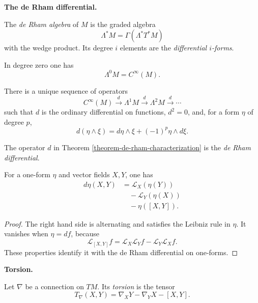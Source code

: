 \medskip\noindent
{\bf The de Rham differential.}

\begin{definition}
\label{definition-de-rham-algebra-course}
The {\it de Rham algebra} of $M$ is the
graded algebra
$$
\Lambda^*M
=\Gamma(\Lambda^*T^*M)
$$
with the wedge product. Its degree $i$
elements are the
{\it differential $i$-forms}.
\end{definition}

In degree zero one has
$$
\Lambda^0M=C^\infty(M).
$$

\begin{theorem}
\label{theorem-de-rham-characterization}
There is a unique sequence of operators
$$
C^\infty(M)\xrightarrow{d}\Lambda^1M
\xrightarrow{d}\Lambda^2M
\xrightarrow{d}\cdots
$$
such that $d$ is the ordinary differential
on functions, $d^2=0$, and, for a form
$\eta$ of degree $p$,
$$
d(\eta\wedge\xi)
=d\eta\wedge\xi
+(-1)^p\eta\wedge d\xi.
$$
\end{theorem}

\begin{definition}
\label{definition-de-rham-differential}
The operator $d$ in Theorem
\ref{theorem-de-rham-characterization} is
the {\it de Rham differential}.
\end{definition}

\begin{proposition}
\label{proposition-cartan-one-form}
For a one-form $\eta$ and vector fields
$X,Y$, one has
$$
\begin{aligned}
d\eta(X,Y)
&=\mathcal{L}_X(\eta(Y))\\
&\quad-\mathcal{L}_Y(\eta(X))\\
&\quad-\eta([X,Y]).
\end{aligned}
$$
\end{proposition}

\begin{proof}
The right hand side is alternating and
satisfies the Leibniz rule in $\eta$. It
vanishes when $\eta=df$, because
$$
\mathcal{L}_{[X,Y]}f
=\mathcal{L}_X\mathcal{L}_Yf
-\mathcal{L}_Y\mathcal{L}_Xf.
$$
These properties identify it with the de
Rham differential on one-forms.
\end{proof}

\medskip\noindent
{\bf Torsion.}

\begin{definition}
\label{definition-torsion-vector}
Let $\nabla$ be a connection on $TM$. Its
{\it torsion} is the tensor
$$
T_\nabla(X,Y)
=\nabla_XY-\nabla_YX-[X,Y].
$$
\end{definition}

